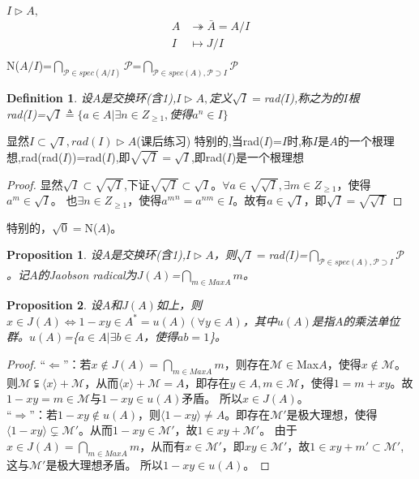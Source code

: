 \documentclass[UTF8]{article}
\newtheorem{defn}{Definition}[section]
\newtheorem{prop}{Proposition}[section]
\begin{document}
$I\vartriangleright A,$
\[
\begin{split}
A&\twoheadrightarrow\bar A=A/I\\
I&\longmapsto J/I\\
\end{split}
\]
N($A/I$)=$\bigcap_{\mathcal P\in spec(A/I)}\mathcal P$=$\bigcap_{\mathcal P\in spec(A),\mathcal P\supset I}\mathcal P$

\begin{defn}
	设$A$是交换环(含1),$I\vartriangleright A,$定义$\sqrt I=$rad($I$),称之为的$I$根\\
	rad($I$)=$\sqrt I\triangleq \{a\in A|\exists n\in Z_{\geq1},$使得$a^n\in I\}$
\end{defn}

显然$I\subset\sqrt I,rad(I)\vartriangleright A$(课后练习)
特别的,当rad($I$)=$I$时,称$I$是$A$的一个根理想,rad(rad($I$))=rad($I$),即$\sqrt{\sqrt I}=\sqrt I$,即rad($I$)是一个根理想
\begin{proof}
	显然$\sqrt I\subset\sqrt{\sqrt I}$,下证$\sqrt{\sqrt I}\subset\sqrt I$。$\forall a\in\sqrt{\sqrt I},\exists m\in Z_{\geq1}$，使得$a^m\in\sqrt I$。
	也$\exists n\in Z_{\geq1}$，使得${a^m}^n=a^{nm}\in I$。故有$a\in\sqrt I$，即$\sqrt I=\sqrt{\sqrt I}$
\end{proof}
特别的，$\sqrt0=$N($A$)。

\begin{prop}
	设$A$是交换环(含1),$I\vartriangleright A$，则$\sqrt I=$rad($I$)=$\bigcap_{\mathcal P\in spec(A),\mathcal P\supset I}\mathcal P$。记$A$的Jaobson radical为$J(A)$=$\bigcap_{m\in Max A}m$。
\end{prop}

\begin{prop}
	设$A$和$J(A)$如上，则$x\in J(A)\Longleftrightarrow 1-xy\in A^{*}=u(A)(\forall y\in A)$，其中$u(A)$是指$A$的乘法单位群。$u(A)$=\{$a\in A|\exists b\in A$，使得$ab=1$\}。
\end{prop}

\begin{proof}
	“$\Leftarrow$”：若$x\notin J(A)=\bigcap_{m\in Max A}m$，则存在$\mathcal M\in$Max$A$，使得$x\notin\mathcal M$。
	则$\mathcal M\subsetneqq\langle x\rangle+\mathcal M$，从而$\langle x\rangle+\mathcal M=A$，即存在$y\in A,m\in\mathcal M $，使得$1=m+xy$。故$1-xy=m\in\mathcal M$与$1-xy\in u(A)$矛盾。
	所以$x\in J(A)$。\\
	“$\Rightarrow$”：若$1-xy\notin u(A)$，则$\langle{1-xy}\rangle\neq A$。即存在$\mathcal M'$是极大理想，使得$\langle{1-xy}\rangle\subsetneq\mathcal M'$。从而$1-xy\in \mathcal M'$，故$1\in xy+\mathcal M'$。
	由于$x\in J(A)=\bigcap_{m\in Max A}m$，从而有$x\in \mathcal M'$，即$xy\in \mathcal M'$，故$1\in{xy+m'}\subset \mathcal M'$,这与$\mathcal M'$是极大理想矛盾。
	所以$1-xy\in u(A)$。
\end{proof}
\end{document}
